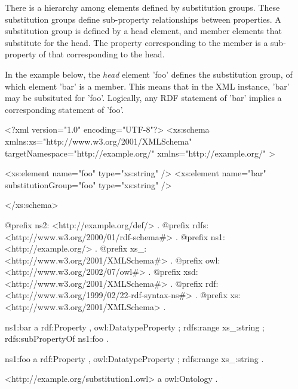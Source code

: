 There is a hierarchy among elements defined by substitution groups. These substitution groups define sub-\/property relationships between properties. A substitution group is defined by a head element, and member elements that substitute for the head. The property corresponding to the member is a sub-\/property of that corresponding to the head.

In the example below, the {\itshape head\/} element 'foo' defines the substitution group, of which element 'bar' is a member. This means that in the XML instance, 'bar' may be subsituted for 'foo'. Logically, any RDF statement of 'bar' implies a corresponding statement of 'foo'.


\begin{DoxyCodeInclude}
<?xml version="1.0" encoding="UTF-8"?>
<xs:schema xmlns:xs="http://www.w3.org/2001/XMLSchema" 
        targetNamespace="http://example.org/" xmlns="http://example.org/" >
        
        <xs:element name="foo" type="xs:string" />      
        <xs:element name="bar" substitutionGroup="foo" type="xs:string" />

</xs:schema>
\end{DoxyCodeInclude}
 
\begin{DoxyCodeInclude}
@prefix ns2:     <http://example.org/def/> .
@prefix rdfs:    <http://www.w3.org/2000/01/rdf-schema#> .
@prefix ns1:     <http://example.org/> .
@prefix xs_:     <http://www.w3.org/2001/XMLSchema#> .
@prefix owl:     <http://www.w3.org/2002/07/owl#> .
@prefix xsd:     <http://www.w3.org/2001/XMLSchema#> .
@prefix rdf:     <http://www.w3.org/1999/02/22-rdf-syntax-ns#> .
@prefix xs:      <http://www.w3.org/2001/XMLSchema> .

ns1:bar
      a       rdf:Property , owl:DatatypeProperty ;
      rdfs:range xs_:string ;
      rdfs:subPropertyOf ns1:foo .

ns1:foo
      a       rdf:Property , owl:DatatypeProperty ;
      rdfs:range xs_:string .

<http://example.org/substitution1.owl>
      a       owl:Ontology .
\end{DoxyCodeInclude}
 